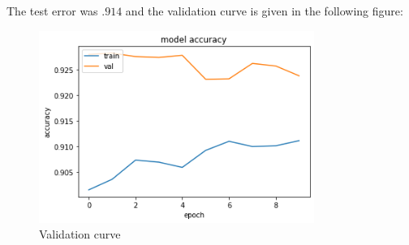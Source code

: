 The test error was $.914$ and the validation curve is given in the following figure:
\begin{figure}[H]
    \begin{center}
        \includegraphics[width=0.8\textwidth]{img/img2.jpg}
        \caption{Validation curve}
    \end{center}
\end{figure}



